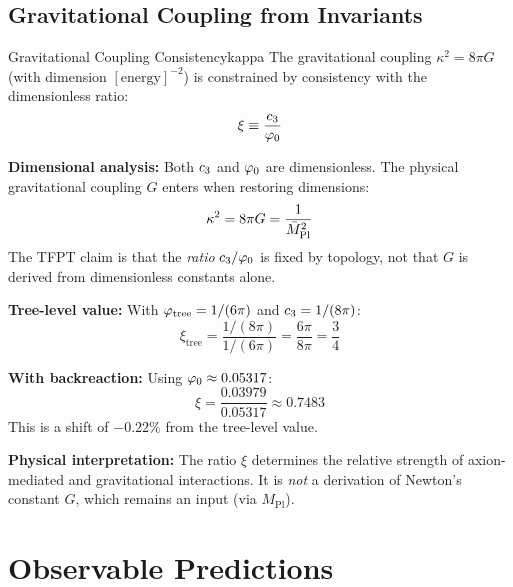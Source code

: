 \subsection{Gravitational Coupling from Invariants}

\begin{corollary}{Gravitational Coupling Consistency}{kappa}
The gravitational coupling $\kappa^2 = 8\pi G$ (with dimension $[\text{energy}]^{-2}$) 
is constrained by consistency with the dimensionless ratio:
\begin{equation}
    \xi \equiv \frac{c_3}{\varphi_0}
\end{equation}

\textbf{Dimensional analysis:} Both $c_3$ and $\varphi_0$ are dimensionless. The 
physical gravitational coupling $G$ enters when restoring dimensions:
\begin{equation}
    \kappa^2 = 8\pi G = \frac{1}{\bar{M}_{\mathrm{Pl}}^2}
\end{equation}
The TFPT claim is that the \emph{ratio} $c_3/\varphi_0$ is fixed by topology, 
not that $G$ is derived from dimensionless constants alone.

\textbf{Tree-level value:} With $\varphi_{\mathrm{tree}} = 1/(6\pi)$ and $c_3 = 1/(8\pi)$:
\begin{equation}
    \xi_{\text{tree}} = \frac{1/(8\pi)}{1/(6\pi)} = \frac{6\pi}{8\pi} = \frac{3}{4}
\end{equation}

\textbf{With backreaction:} Using $\varphi_0 \approx 0.05317$:
\begin{equation}
    \xi = \frac{0.03979}{0.05317} \approx 0.7483
\end{equation}
This is a shift of $-0.22\%$ from the tree-level value.

\textbf{Physical interpretation:} The ratio $\xi$ determines the relative strength 
of axion-mediated and gravitational interactions. It is \emph{not} a derivation of 
Newton's constant $G$, which remains an input (via $M_{\text{Pl}}$).
\end{corollary}

\section{Observable Predictions}

